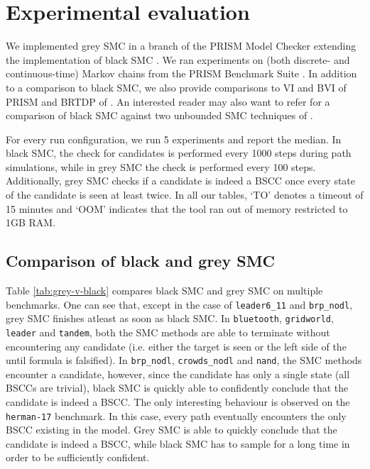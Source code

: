 \section{Experimental evaluation}\label{sec:experiments}



We implemented grey SMC in a branch of the PRISM Model Checker \cite{prism} extending the implementation of black SMC \cite{DHKPjournal}.
We ran experiments on (both discrete- and continuous-time) Markov chains from the PRISM Benchmark Suite \cite{prism-benchmark-suite}.
In addition to a comparison to black SMC, we also provide comparisons to VI and BVI of PRISM and BRTDP of \cite{atva14}.
An interested reader may also want to refer \cite[Table II]{DHKPjournal} for a comparison of black SMC against two unbounded SMC techniques of \cite{YCZ10}.

For every run configuration, we run 5 experiments and report the median.
In black SMC, the check for candidates is performed every 1000 steps during path simulations, while in grey SMC the check is performed every 100 steps.
Additionally, grey SMC checks if a candidate is indeed a BSCC once every state of the candidate is seen at least twice.
In all our tables, `TO' denotes a timeout  of 15 minutes and `OOM' indicates that the tool ran out of memory restricted to 1GB RAM.

\subsection{Comparison of black and grey SMC}

 


Table \ref{tab:grey-v-black} compares black SMC and grey SMC on multiple benchmarks. 
One can see that, except in the case of \texttt{leader6\_11} and \texttt{brp\_nodl}, grey SMC finishes atleast as soon as black SMC.
In \texttt{bluetooth}, \texttt{gridworld}, \texttt{leader} and \texttt{tandem}, both the SMC methods are able to terminate without encountering any candidate (i.e. either the target is seen or the left side of the until formula is falsified).
In \texttt{brp\_nodl}, \texttt{crowds\_nodl} and \texttt{nand}, the SMC methods encounter a candidate, however, since the candidate has only a single state (all BSCCs are trivial), black SMC is quickly able to confidently conclude that the candidate is indeed a BSCC.
The only interesting behaviour is observed on the \texttt{herman-17} benchmark. 
In this case, every path eventually encounters the only BSCC existing in the model.
Grey SMC is able to quickly conclude that the candidate is indeed a BSCC, while black SMC has to sample for a long time in order to be sufficiently confident.

